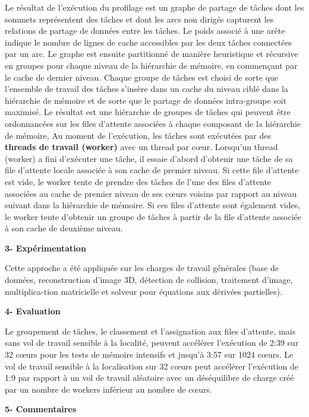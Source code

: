 Le résultat de l'exécution du profilage est un graphe de partage de tâches dont les sommets représentent des tâches et dont les arcs non dirigés capturent les relations de partage de données entre les tâches. 
Le poids associé à une arête indique le nombre de lignes de cache accessibles par les deux tâches connectées par un arc. 
Le graphe est ensuite partitionné de manière heuristique et récursive en groupes pour chaque niveau de la hiérarchie de mémoire, en commençant par le cache de dernier niveau. 
Chaque groupe de tâches est choisi de sorte que l'ensemble de travail des tâches s'insère dans un cache du niveau ciblé dans la hiérarchie de mémoire et de sorte que le partage de données intra-groupe soit maximisé. 
Le résultat est une hiérarchie de groupes de tâches qui peuvent être ordonnancées sur les files d'attente associées à chaque composant de la hiérarchie de mémoire, 
%
Au moment de l'exécution, les tâches sont exécutées par des \textbf{threads de travail (worker)} avec un thread par cœur. 
Lorsqu'un thread (worker) a fini d'exécuter une tâche, il essaie d'abord d'obtenir une tâche de sa file d'attente locale associée à son cache de premier niveau.
Si cette file d'attente est vide, le worker tente de prendre des tâches de l'une des files d'attente associées au cache de premier niveau de ses cœurs voisins par rapport au niveau suivant dans la hiérarchie de mémoire. 
Si ces files d'attente sont également vides, le worker tente d'obtenir un groupe de tâches à partir de la file d'attente associée à son cache de deuxième niveau. 

\textbf{3- Expérimentation}

Cette approche a été appliquée sur les charges de travail générales (base de données, reconstruction d'image 3D, détection de collision, traitement d'image, multiplica-tion matricielle et solveur pour équations aux dérivées partielles).

\textbf{4- Evaluation}  

Le groupement de tâches, le classement et l'assignation aux files d'attente, mais sans vol de travail sensible à la localité, peuvent accélérer l'exécution de 2:39 sur 32 cœurs pour les tests de mémoire intensifs et jusqu'à 3:57 sur 1024 cœurs. 
Le vol de travail sensible à la localisation sur 32 cœurs peut accélérer l'exécution de 1:9 par rapport à un vol de travail aléatoire avec un déséquilibre de charge créé par un nombre de workers inférieur au nombre de cœurs. 

\textbf{5- Commentaires}

